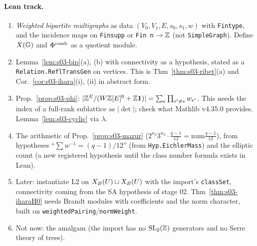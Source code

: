 \paragraph{Lean track.}
\begin{enumerate}[label=L\arabic*.]
\item \emph{Weighted bipartite multigraphs} as data $(V_0,V_1,E,s_0,s_1,w)$ with \texttt{Fintype}, and the incidence maps on
  \texttt{Finsupp} or \texttt{Fin n} $\to\mathbb{Z}$ (not \texttt{SimpleGraph}). Define $X(\mathbb{G})$ and $\Phi^{\mathrm{comb}}$ as a quotient module.
\item Lemma~\ref{lem:s03-bip}(a), (b) with connectivity as a hypothesis, stated as a \texttt{Relation.ReflTransGen} on vertices. This is
  Thm~\ref{thm:s03-ribet}(a) and Cor.~\ref{cor:s03-ihara}(i), (ii) in abstract form.
\item Prop.~\ref{prop:s03-phi}: $|\mathbb{Z}^E/(W\mathbb{Z}[E]^0+\mathbb{Z}\mathbf1)|=\sum_e\prod_{e'\ne e}w_{e'}$. This needs the index of a full-rank sublattice
  as $|\det|$; check what Mathlib v4.35.0 provides. Lemma~\ref{lem:s03-cyclic} via $\lambda$.
\item The arithmetic of Prop.~\ref{prop:s03-mazur} ($2^{n_2}3^{n_3}\cdot\frac{q-1}{12}=\mathrm{num}\frac{q-1}{12}$), from hypotheses
  ``$\sum w^{-1}=(q-1)/12$'' (from \texttt{Hyp.EichlerMass}) and the elliptic count (a new registered hypothesis until the class number
  formula exists in Lean).
\item Later: instantiate L2 on $X_B(U)\sqcup X_B(U)$ with the import's \texttt{classSet}, connectivity coming from the SA hypothesis of
  stage 02. Thm~\ref{thm:s03-iharaH0} needs Brandt modules with coefficients and the norm character, built on
  \texttt{weightedPairing}/\texttt{normWeight}.
\item Not now: the amalgam (the import has no $\mathrm{SL}_2(\mathbb{Z})$ generators and no Serre theory of trees).
\end{enumerate}

